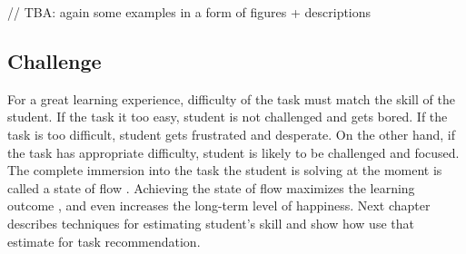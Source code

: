 // TBA: again some examples in a form of figures + descriptions



\subsection{Challenge}
\label{sec:motivation.challenge}
For a great learning experience,
  difficulty of the task must match the skill of the student.
If the task it too easy,
  student is not challenged and gets bored.
If the task is too difficult,
  student gets frustrated and desperate.
On the other hand, if the task has appropriate difficulty,
  student is likely to be challenged and focused.
The complete immersion into the task the student is solving at the moment is called
  a state of flow \cite{flow}.
Achieving the state of flow maximizes the learning outcome \cite{adaptive-practice},
  and even increases the long-term level of happiness. %
Next chapter describes techniques for estimating student’s skill
  and show how use that estimate for task recommendation.
